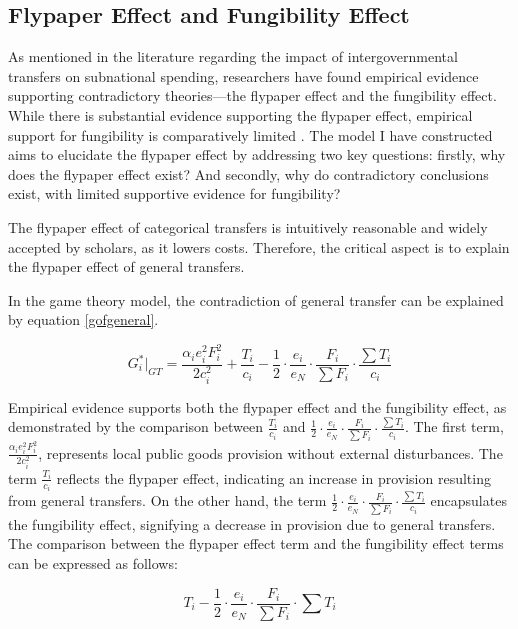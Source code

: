 \subsection{Flypaper Effect and Fungibility Effect}


As mentioned in the literature regarding the impact of intergovernmental transfers on subnational spending, researchers have found empirical evidence supporting contradictory theories—the flypaper effect and the fungibility effect. While there is substantial evidence supporting the flypaper effect, empirical support for fungibility is comparatively limited \parencite{zampelli1986resource, khilji1991fungibility, khilji1994fungibility}. The model I have constructed aims to elucidate the flypaper effect by addressing two key questions: firstly, why does the flypaper effect exist? And secondly, why do contradictory conclusions exist, with limited supportive evidence for fungibility?%

The flypaper effect of categorical transfers is intuitively reasonable and widely accepted by scholars, as it lowers costs. Therefore, the critical aspect is to explain the flypaper effect of general transfers.%

In the game theory model, the contradiction of general transfer can be explained by equation \ref{gofgeneral}.

$$G_i^*|_{GT}=\frac{\alpha_i e_i^2F_i^2}{2c_i^2}+\frac{T_i}{c_i}-\frac{1}{2}\cdot \frac{e_i}{e_N}\cdot \frac{F_i}{\sum F_i} \cdot \frac{\sum T_i}{c_i}$$

Empirical evidence supports both the flypaper effect and the fungibility effect, as demonstrated by the comparison between $\frac{T_i}{c_i}$ and $\frac{1}{2}\cdot \frac{e_i}{e_N}\cdot \frac{F_i}{\sum F_i} \cdot \frac{\sum T_i}{c_i}$. The first term, $\frac{\alpha_i e_i^2F_i^2}{2c_i^2}$, represents local public goods provision without external disturbances. The term $\frac{T_i}{c_i}$ reflects the flypaper effect, indicating an increase in provision resulting from general transfers. On the other hand, the term $\frac{1}{2}\cdot \frac{e_i}{e_N}\cdot \frac{F_i}{\sum F_i} \cdot \frac{\sum T_i}{c_i}$ encapsulates the fungibility effect, signifying a decrease in provision due to general transfers. The comparison between the flypaper effect term and the fungibility effect terms can be expressed as follows:%

\begin{equation}
    T_i-\frac{1}{2}\cdot \frac{e_i}{e_N}\cdot \frac{F_i}{\sum F_i} \cdot \sum T_i \label{compare}
\end{equation}


